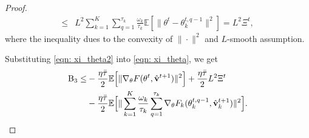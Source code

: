 \documentclass[twoside,journal]{IEEEtran}
\def\VectorFont{\bf}
\newcommand{\vv}{{\VectorFont v}}
\begin{document}
\begin{proof}
\begin{align}
\leq&L^2\sum_{k=1}^K\sum_{q=1}^{\tau_k}
\frac{\omega_k}{\tau_k}\mathbb{E}[\|\theta^t-\theta_k^{t,q-1}\|^2]=L^2\Xi^t,
\end{align}
where the  inequality dues to the convexity of $\|\cdot\|^2$ and  $L$-smooth  assumption.

Substituting \eqref{eqn: xi_theta2} into \eqref{eqn: xi_theta}, we get
\begin{align}\label{eqn: xi_theta4}
\nonumber \textmd{B}_3\leq&-\frac{\eta\bar{\tau} }{2}\mathbb{E}\Big[\|\nabla_{\theta}F(\theta^t,\hat{\vv}^{t+1})\|^2\Big]
+\frac{\eta\bar{\tau}}{2}L^2\Xi^t\\
&-\frac{\eta\bar{\tau}}{2}\mathbb{E}\Big[\|\sum_{k=1}^K\frac{\omega_k}{\tau_k}\sum_{q=1}^{\tau_k}
\nabla_{\theta} F_k(\theta_k^{t,q-1}, \hat \vv_k^{t+1} )\|^2\Big].
\end{align}


\end{proof}
\end{document}
